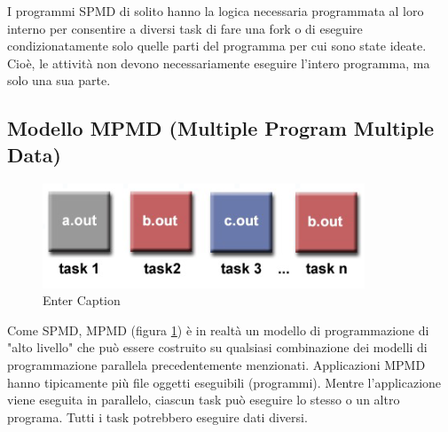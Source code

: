 I programmi SPMD di solito hanno la logica necessaria programmata al loro interno per consentire a diversi task di fare una fork o di eseguire condizionatamente solo quelle parti del programma per cui sono state ideate. Cioè, le attività non devono necessariamente eseguire l'intero programma, ma solo una sua parte.

\subsection{Modello MPMD (Multiple Program Multiple Data)} 
\begin{figure}[th]
    \centering
    \includegraphics[width=0.75\linewidth]{img/mpmd.png}
    \caption{Enter Caption}
    \label{fig:enter-label}
\end{figure}
Come SPMD, MPMD (figura \ref{fig:enter-label}) è in realtà un modello di programmazione di "alto livello" che può essere costruito su qualsiasi combinazione dei modelli di programmazione parallela precedentemente menzionati. Applicazioni MPMD hanno tipicamente più file oggetti eseguibili (programmi). Mentre l'applicazione viene eseguita in parallelo, ciascun task può eseguire lo stesso o un altro programa. Tutti i task potrebbero eseguire dati diversi.